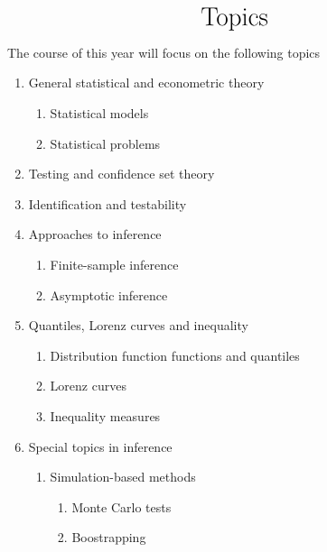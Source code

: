\documentclass[titlepage,11pt,amstex]{article}
\begin{document}
\quad \newpage

\begin{equation*}
\text{{\huge Topics}}
\end{equation*}

The course of this year will focus on the following topics

\begin{enumerate}
\item General statistical and econometric theory

\begin{enumerate}
\item Statistical models

\item Statistical problems
\end{enumerate}

\item Testing and confidence set theory

\item Identification and testability

\item Approaches to inference

\begin{enumerate}
\item Finite-sample inference

\item Asymptotic inference
\end{enumerate}

\item Quantiles, Lorenz curves and inequality

\begin{enumerate}
\item Distribution function functions and quantiles

\item Lorenz curves

\item Inequality measures
\end{enumerate}

\item Special topics in inference

\begin{enumerate}
\item Simulation-based methods

\begin{enumerate}
\item Monte Carlo tests

\item Boostrapping
\end{enumerate}


\end{enumerate}
\end{enumerate}
\end{document}
